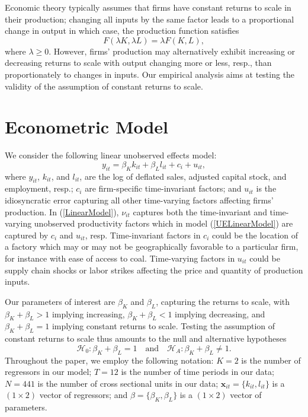 \documentclass[11pt]{article}
\begin{document}
Economic theory typically assumes that firms have constant returns to scale in their production; changing all inputs by the same factor leads to a proportional change in output in which case, the production function satisfies   
\begin{equation}
    F(\lambda K,\lambda L)=\lambda F(K,L),
\end{equation}
where $\lambda \geq 0$. 
However, firms' production may alternatively exhibit increasing or decreasing returns to scale with output changing more or less, resp., than proportionately to changes in inputs. Our empirical analysis aims at testing the validity of the assumption of constant returns to scale.

\section{Econometric Model}
We consider the following linear unobserved effects model: 
\begin{equation}
\label{UELinearModel}
    y_{it} = \beta_K k_{it} + \beta_L l_{it} + c_i + u_{it}, 
\end{equation}
where $y_{it}$, $k_{it}$, and $l_{it}$, are the log of deflated sales, adjusted capital stock, and employment, resp.; $c_i$ are firm-specific time-invariant factors; and $u_{it}$ is the idiosyncratic error capturing all other time-varying factors affecting firms' production. 
In (\ref{LinearModel}), $\nu_{it}$ captures both the time-invariant and time-varying unobserved productivity factors which in model (\ref{UELinearModel}) are captured by $c_i$ and $u_{it}$, resp. Time-invariant factors in $c_i$ could be the location of a factory which may or may not be geographically favorable to a particular firm, for instance with ease of access to coal. Time-varying factors in $u_{it}$ could be supply chain shocks or labor strikes affecting the price and quantity of production inputs.

Our parameters of interest are $\beta_K$ and $\beta_L$, capturing the returns to scale, with $\beta_K+\beta_L > 1$ implying increasing, $\beta_K+\beta_L<1$ implying decreasing, and $\beta_K+\beta_L=1$ implying constant returns to scale. Testing the assumption of constant returns to scale thus amounts to the null and alternative hypotheses 
\begin{equation}
    \mathcal{H}_0: \beta_K+\beta_L=1 \quad \text{and} \quad \mathcal{H}_A: \beta_K+\beta_L\ne1.
\end{equation}
Throughout the paper, we employ the following notation: $K=2$ is the number of regressors in our model; $T=12$ is the number of time periods in our data; $N=441$ is the number of cross sectional units in our data; $\textbf{x}_{it}=\{k_{it},l_{it}\}$ is a $(1\times2)$ vector of regressors; and $\beta=\{\beta_K,\beta_L\}$ is a $(1\times2)$ vector of parameters. 
\end{document}

